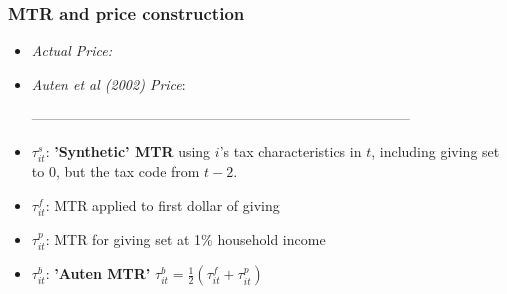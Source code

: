 \documentclass[options]{beamer}
\begin{document}
\begin{frame}
	\frametitle{MTR and price construction}
	\begin{itemize}
		
		

\item[] \textit{Actual Price:} 
\item[] \textit{Auten et al (2002) Price}:  \vspace{10pt}

---------------------------------------------------------------------------------
\vspace{10pt}
\item[]$\tau_{it}^{s}$: \textbf{'Synthetic' MTR}  using $i$'s tax  characteristics in $t$, including giving
set to 0, but the tax code from  $t-2$. \vspace{9pt}

\item[] $\tau_{it}^{f}$: MTR applied to first dollar of giving \vspace{9pt}
\item[]  $\tau_{it}^{p}$:  MTR for giving set at 1\% household income \vspace{9pt}
\item[]  $\tau_{it}^{b}$: \textbf{'Auten MTR'} $\tau_{it}^{b}=\frac{1}{2}(\tau_{it}^{f}+\tau_{it}^{p})$


\end{itemize}\end{frame}
\end{document}
